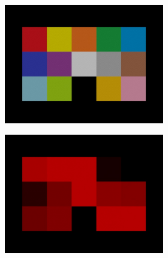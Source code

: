 \begin{figure}
    \begin{subfigure}{\textwidth}
        \begin{subfigure}{0.24\textwidth}
            \centering
            \includegraphics[width=\textwidth]{images/02-spd_intuition-palette_white.jpg}
        \end{subfigure}
        \hfill
        \begin{subfigure}{0.24\textwidth}
            \centering
            \includegraphics[width=\textwidth]{images/02-spd_intuition-palette_red.jpg}
        \end{subfigure}
        \hfill
        \begin{subfigure}{0.24\textwidth}
            \centering

\end{subfigure}
\end{subfigure}
\end{figure}
